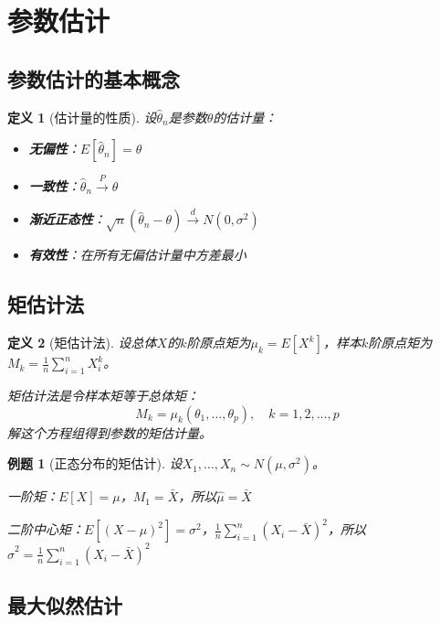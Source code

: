 \documentclass[12pt,a4paper]{article}
\newtheorem{definition}{定义}[section]
\newtheorem{example}{例题}[section]
\theoremstyle{remark}
\begin{document}
\section{参数估计}

\subsection{参数估计的基本概念}

\begin{definition}[估计量的性质]
设$\hat{\theta}_n$是参数$\theta$的估计量：
\begin{itemize}
\item \textbf{无偏性}：$E[\hat{\theta}_n] = \theta$
\item \textbf{一致性}：$\hat{\theta}_n \stackrel{P}{\to} \theta$
\item \textbf{渐近正态性}：$\sqrt{n}(\hat{\theta}_n - \theta) \stackrel{d}{\to} N(0, \sigma^2)$
\item \textbf{有效性}：在所有无偏估计量中方差最小
\end{itemize}
\end{definition}

\subsection{矩估计法}

\begin{definition}[矩估计法]
设总体$X$的$k$阶原点矩为$\mu_k = E[X^k]$，样本$k$阶原点矩为$M_k = \frac{1}{n}\sum_{i=1}^n X_i^k$。

矩估计法是令样本矩等于总体矩：
$$M_k = \mu_k(\theta_1, \ldots, \theta_p), \quad k = 1, 2, \ldots, p$$
解这个方程组得到参数的矩估计量。
\end{definition}

\begin{example}[正态分布的矩估计]
设$X_1, \ldots, X_n \sim N(\mu, \sigma^2)$。

一阶矩：$E[X] = \mu$，$M_1 = \bar{X}$，所以$\hat{\mu} = \bar{X}$

二阶中心矩：$E[(X-\mu)^2] = \sigma^2$，$\frac{1}{n}\sum_{i=1}^n (X_i - \bar{X})^2$，所以$\hat{\sigma}^2 = \frac{1}{n}\sum_{i=1}^n (X_i - \bar{X})^2$
\end{example}

\subsection{最大似然估计}
\end{document}
